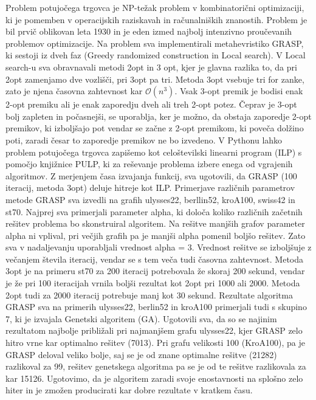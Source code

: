 \documentclass[12pt,a4paper]{amsart}
\theoremstyle{definition} %
\theoremstyle{plain} %
\begin{document}
Problem potujočega trgovca je NP-težak problem v kombinatorični optimizaciji, ki je pomemben v operacijskih raziskavah in računalniških znanostih.  Problem je bil prvič oblikovan leta 1930 in je eden izmed najbolj intenzivno proučevanih problemov optimizacije. Na problem sva implementirali metahevristiko GRASP, ki sestoji iz dveh faz (Greedy randomized construction in Local search). V Local search-u sva obravnavali metodi 2opt in 3 opt, kjer je glavna razlika to, da pri 2opt zamenjamo dve vozlišči, pri 3opt pa tri. Metoda 3opt vsebuje tri for zanke, zato je njena časovna zahtevnost kar  $\mathcal{O}(n^3)$. Vsak 3-opt premik je bodisi enak 2-opt premiku ali je enak zaporedju dveh ali treh 2-opt potez. Čeprav je 3-opt bolj zapleten in počasnejši, se uporablja, ker je možno, da obstaja zaporedje 2-opt premikov, ki izboljšajo pot vendar se začne z 2-opt premikom, ki poveča dolžino poti, zaradi česar to zaporedje premikov ne bo izvedeno.  V Pythonu lahko problem potujočega trgovca zapišemo kot celoštevilski linearni program (ILP) s pomočjo knjižnice PULP, ki za reševanje problema izbere enega od vgrajenih algoritmov. Z merjenjem časa izvajanja funkcij, sva ugotovili, da GRASP (100 iteracij, metoda 3opt) deluje hitreje kot ILP.  Primerjave različnih parametrov metode GRASP sva izvedli na grafih ulysses22, berllin52, kroA100, swiss42 in st70.  Najprej sva primerjali parameter alpha, ki določa koliko različnih začetnih rešitev problema bo skonstruiral algoritem. Na rešitve manjših grafov parameter alpha ni vplival, pri večjih grafih pa je manjši alpha pomenil boljšo rešitev. Zato sva v nadaljevanju uporabljali vrednost alpha = 3. Vrednost rešitve se izboljšuje z večanjem števila iteracij, vendar se s tem veča tudi časovna zahtevnost. Metoda 3opt je na primeru st70 za 200 iteracij potrebovala že skoraj 200 sekund, vendar je že pri 100 iteracijah vrnila boljši rezultat kot 2opt pri 1000 ali 2000. Metoda 2opt tudi za 2000 iteracij potrebuje manj kot 30 sekund. Rezultate algoritma GRASP sva na primerih ulysses22, berlin52 in kroA100 primerjali tudi s skupino 7, ki je izvajala Genetski algoritem (GA). Ugotovili sva, da so se najinim rezultatom najbolje približali pri najmanjšem grafu ulysses22, kjer GRASP zelo hitro vrne kar optimalno rešitev (7013). Pri grafu velikosti 100 (KroA100), pa je GRASP deloval veliko bolje, saj se je od znane optimalne rešitve (21282) razlikoval za 99, rešitev genetskega algoritma pa se je od te rešitve razlikovala za kar 15126. Ugotovimo, da je algoritem zaradi svoje enostavnosti na splošno zelo hiter in je zmožen producirati kar dobre rezultate v kratkem času. 
\end{document}
